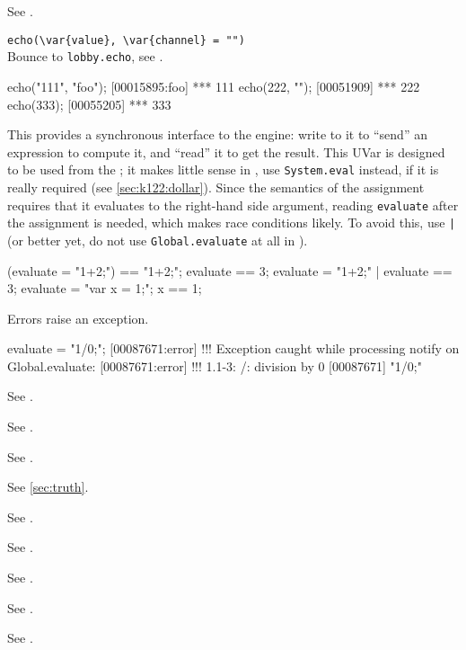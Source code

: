 \begin{urbiscriptapi}
\item[Duration] See .

\item \lstinline|echo(\var{value}, \var{channel} = "")|\\
  Bounce to \lstinline|lobby.echo|, see .
\begin{urbiscript}
echo("111", "foo");
[00015895:foo] *** 111
echo(222, "");
[00051909] *** 222
echo(333);
[00055205] *** 333
\end{urbiscript}

\item[evaluate] This  provides a synchronous interface
  to the \urbi engine: write to it to ``send'' an expression to
  compute it, and ``read'' it to get the result.  This UVar is
  designed to be used from the \Cxx; it makes little sense in \us, use
  \lstinline|System.eval| instead, if it is really required (see
  \autoref{sec:k122:dollar}).  Since the semantics of the assignment
  requires that it evaluates to the right-hand side argument, reading
  \lstinline|evaluate| after the assignment is needed, which makes
  race conditions likely.  To avoid this, use \lstinline{|} (or better
  yet, do not use \lstinline|Global.evaluate| at all in \us).

\begin{urbiassert}
(evaluate = "1+2;") == "1+2;";
 evaluate == 3;
{ evaluate = "1+2;" | evaluate } == 3;
{ evaluate = "var x = 1;"; x } == 1;
\end{urbiassert}

  Errors raise an exception.

\begin{urbiscript}
evaluate = "1/0;";
[00087671:error] !!! Exception caught while processing notify on Global.evaluate:
[00087671:error] !!! 1.1-3: /: division by 0
[00087671] "1/0;"
\end{urbiscript}

\item[Event] See .
\item[Exception] See .
\item[Executable] See .
\item[false]  See \autoref{sec:truth}.
\item[File] See .
\item[Finalizable] See .
\item[Float] See .
\item[FormatInfo] See .
\item[Formatter] See .


\end{urbiscriptapi}
